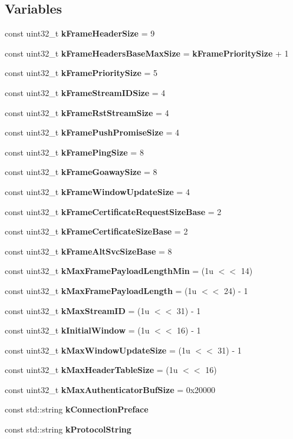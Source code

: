 \subsection*{Variables}
\begin{DoxyCompactItemize}
\item 
const uint32\+\_\+t {\bf k\+Frame\+Header\+Size} = 9
\item 
const uint32\+\_\+t {\bf k\+Frame\+Headers\+Base\+Max\+Size} = {\bf k\+Frame\+Priority\+Size} + 1
\item 
const uint32\+\_\+t {\bf k\+Frame\+Priority\+Size} = 5
\item 
const uint32\+\_\+t {\bf k\+Frame\+Stream\+I\+D\+Size} = 4
\item 
const uint32\+\_\+t {\bf k\+Frame\+Rst\+Stream\+Size} = 4
\item 
const uint32\+\_\+t {\bf k\+Frame\+Push\+Promise\+Size} = 4
\item 
const uint32\+\_\+t {\bf k\+Frame\+Ping\+Size} = 8
\item 
const uint32\+\_\+t {\bf k\+Frame\+Goaway\+Size} = 8
\item 
const uint32\+\_\+t {\bf k\+Frame\+Window\+Update\+Size} = 4
\item 
const uint32\+\_\+t {\bf k\+Frame\+Certificate\+Request\+Size\+Base} = 2
\item 
const uint32\+\_\+t {\bf k\+Frame\+Certificate\+Size\+Base} = 2
\item 
const uint32\+\_\+t {\bf k\+Frame\+Alt\+Svc\+Size\+Base} = 8
\item 
const uint32\+\_\+t {\bf k\+Max\+Frame\+Payload\+Length\+Min} = (1u $<$$<$ 14)
\item 
const uint32\+\_\+t {\bf k\+Max\+Frame\+Payload\+Length} = (1u $<$$<$ 24) -\/ 1
\item 
const uint32\+\_\+t {\bf k\+Max\+Stream\+ID} = (1u $<$$<$ 31) -\/ 1
\item 
const uint32\+\_\+t {\bf k\+Initial\+Window} = (1u $<$$<$ 16) -\/ 1
\item 
const uint32\+\_\+t {\bf k\+Max\+Window\+Update\+Size} = (1u $<$$<$ 31) -\/ 1
\item 
const uint32\+\_\+t {\bf k\+Max\+Header\+Table\+Size} = (1u $<$$<$ 16)
\item 
const uint32\+\_\+t {\bf k\+Max\+Authenticator\+Buf\+Size} = 0x20000
\item 
const std\+::string {\bf k\+Connection\+Preface}
\item 
const std\+::string {\bf k\+Protocol\+String}
\item 

\end{DoxyCompactItemize}
